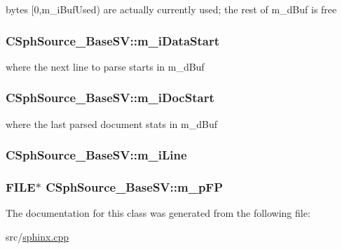 bytes \mbox{[}0,m\-\_\-i\-Buf\-Used) are actually currently used; the rest of m\-\_\-d\-Buf is free 

\hypertarget{classCSphSource__BaseSV_ae4d10220733d93f60cb9cd33d9ac9fab}{
\subsubsection[{m\-\_\-i\-Data\-Start}]{ C\-Sph\-Source\-\_\-\-Base\-S\-V\-::m\-\_\-i\-Data\-Start\hspace{0.3cm}{\ttfamily [protected]}}}\label{classCSphSource__BaseSV_ae4d10220733d93f60cb9cd33d9ac9fab}


where the next line to parse starts in m\-\_\-d\-Buf 

\hypertarget{classCSphSource__BaseSV_a223e0b723cd89cb7ff7f0f70164b52a1}{
\subsubsection[{m\-\_\-i\-Doc\-Start}]{ C\-Sph\-Source\-\_\-\-Base\-S\-V\-::m\-\_\-i\-Doc\-Start\hspace{0.3cm}{\ttfamily [protected]}}}\label{classCSphSource__BaseSV_a223e0b723cd89cb7ff7f0f70164b52a1}


where the last parsed document stats in m\-\_\-d\-Buf 

\hypertarget{classCSphSource__BaseSV_a076423aa982d0c6d7917a588b8b3817d}{
\subsubsection[{m\-\_\-i\-Line}]{ C\-Sph\-Source\-\_\-\-Base\-S\-V\-::m\-\_\-i\-Line\hspace{0.3cm}{\ttfamily [protected]}}}\label{classCSphSource__BaseSV_a076423aa982d0c6d7917a588b8b3817d}
\hypertarget{classCSphSource__BaseSV_a66f169fd368952457057b5bd0aa0c373}{
\subsubsection[{m\-\_\-p\-F\-P}]{\setlength{\rightskip}{0pt plus 5cm}F\-I\-L\-E$\ast$ C\-Sph\-Source\-\_\-\-Base\-S\-V\-::m\-\_\-p\-F\-P\hspace{0.3cm}{\ttfamily [protected]}}}\label{classCSphSource__BaseSV_a66f169fd368952457057b5bd0aa0c373}


The documentation for this class was generated from the following file\-:\begin{DoxyCompactItemize}
\item 
src/\hyperlink{sphinx_8cpp}{sphinx.\-cpp}\end{DoxyCompactItemize}
